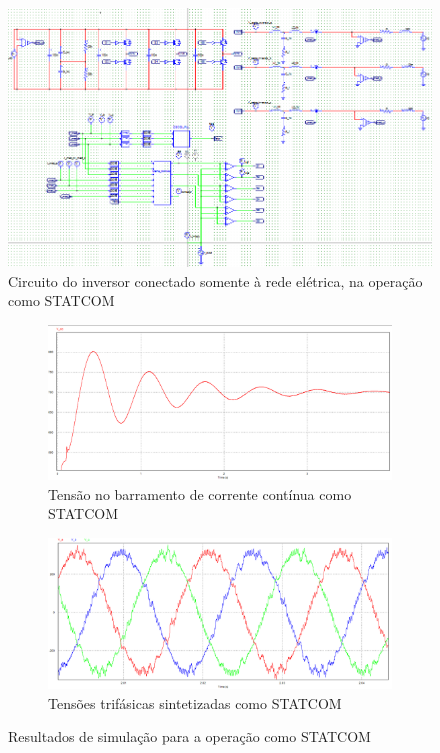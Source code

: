 \begin{figure}[!hbt]
	\begin{center}
    \includegraphics[width=\textwidth]{figuras/sim_figures/statcom/circuito.PNG}
    \caption{Circuito do inversor conectado somente à rede elétrica, na operação como STATCOM}
    \label{fig:sim-circuito-statcom}
    \end{center}
\end{figure}

\begin{figure}[!hbt]
	\centering
	\begin{subfigure}[b]{0.5\textwidth}
		\centering
		\includegraphics[width=\textwidth]{figuras/sim_figures/statcom/barramento-cc.PNG}
		\caption{Tensão no barramento de corrente contínua como STATCOM}
	\end{subfigure}
	
	\begin{subfigure}[b]{0.5\textwidth}
		\centering
		\includegraphics[width=\textwidth]{figuras/sim_figures/statcom/tensoes-trifasicas.PNG}
		\caption{Tensões trifásicas sintetizadas como STATCOM}
	\end{subfigure}

	\caption{Resultados de simulação para a operação como STATCOM}
    \label{fig:sim-statcom}
\end{figure}

